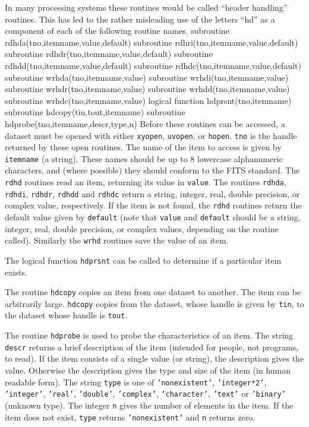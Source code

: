 In many processing systems these routines would be called ``header handling''
routines. This has led to the rather misleading use of the
letters ``hd'' as a component of each of the following routine names.
{\ninepoint\begintt
      subroutine rdhda(tno,itemname,value,default)
      subroutine rdhri(tno,itemname,value,default)
      subroutine rdhdr(tno,itemname,value,default)
      subroutine rdhdd(tno,itemname,value,default)
      subroutine rdhdc(tno,itemname,value,default)
      subroutine wrhda(tno,itemname,value)
      subroutine wrhdi(tno,itemname,value)
      subroutine wrhdr(tno,itemname,value)
      subroutine wrhdd(tno,itemname,value)
      subroutine wrhdc(tno,itemname,value)
      logical function hdprsnt(tno,itemname)
      subroutine hdcopy(tin,tout,itemname)
      subroutine hdprobe(tno,itemname,descr,type,n)
\endtt}
Before these routines can be accessed, a dataset must be opened with
either {\tt xyopen}, {\tt uvopen}, or {\tt hopen}. {\tt tno} is the
handle returned by these open routines.
The name of the item to access is given by {\tt itemname} (a string).
These names should be up to 8 lowercase alphanumeric characters, and
(where possible) they should conform to the FITS standard.
The {\tt rdhd} routines read an item, returning its value in {\tt value}.
The routines {\tt rdhda}, {\tt rdhdi}, {\tt rdhdr}, {\tt rdhdd} and
{\tt rdhdc} return a string,
integer, real, double precision, or complex value, respectively. If the item
is not found, the {\tt rdhd} routines return the default value given
by {\tt default} (note that {\tt value} and {\tt default} should be a string,
integer, real, double precision, or complex values, depending on the routine
called). Similarly
the {\tt wrhd} routines save the value of an item.

The logical function {\tt hdprsnt} can be called to determine if a
particular item exists.

The routine {\tt hdcopy} copies an item from one dataset to another.
The item can be
arbitrarily large. {\tt hdcopy} copies from the dataset, whose handle
is given by {\tt tin}, to the dataset whose handle is {\tt tout}.

The routine {\tt hdprobe} is used to probe the characteristics of an
item.  The string {\tt descr} returns a brief description of the item
(intended for people, not programs, to read). If the item consists of a
single value (or string), the description gives the value. Otherwise
the description gives the type and size of the item (in human readable
form). The string {\tt type} is one of {\tt 'nonexistent'},
{\tt 'integer*2'}, {\tt 'integer'}, {\tt 'real'}, {\tt 'double'},
{\tt 'complex'}, {\tt 'character'}, {\tt 'text'} or {\tt 'binary'}
(unknown type). The integer {\tt n} gives the number of elements in the
item. If the item does not exist, {\tt type} returns {\tt 'nonexistent'}
and {\tt n} returns zero.

